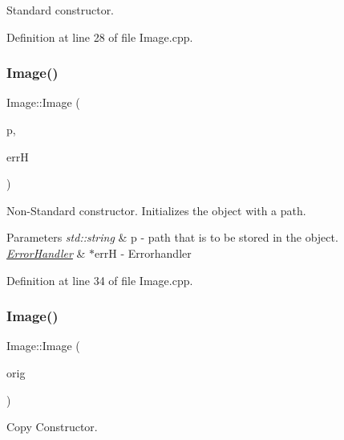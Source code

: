 Standard constructor. 



Definition at line 28 of file Image.\+cpp.

\mbox{\label{classImage_ae17a70dac9941346eab9e5abef1c03c7}} 
\subsubsection{\texorpdfstring{Image()}{Image()}\hspace{0.1cm}{\footnotesize\ttfamily [2/3]}}
{\footnotesize\ttfamily Image\+::\+Image (\begin{DoxyParamCaption}\item[{std\+::string}]{p,  }\item[{\mbox{\hyperlink{classErrorHandler}{Error\+Handler}} $\ast$}]{errH }\end{DoxyParamCaption})}



Non-\/\+Standard constructor. Initializes the object with a path. 


\begin{DoxyParams}{Parameters}
{\em std\+::string} & p -\/ path that is to be stored in the object. \\
\hline
{\em \mbox{\hyperlink{classErrorHandler}{Error\+Handler}}} & $\ast$errH -\/ Errorhandler \\
\hline
\end{DoxyParams}


Definition at line 34 of file Image.\+cpp.

\mbox{\label{classImage_abda271aa11b907dda8c8c8176684227d}} 
\subsubsection{\texorpdfstring{Image()}{Image()}\hspace{0.1cm}{\footnotesize\ttfamily [3/3]}}
{\footnotesize\ttfamily Image\+::\+Image (\begin{DoxyParamCaption}\item[{const \mbox{\hyperlink{classImage}{Image}} \&}]{orig }\end{DoxyParamCaption})}



Copy Constructor. 



